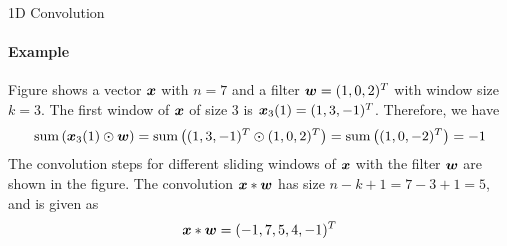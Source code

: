 %
\begin{frame}{1D Convolution}
\framesubtitle{Example}
Figure shows a vector ${\boldsymbol x}$ with $n=7$ and a
    filter ${\boldsymbol w} = (1,0,2)^T$ with window size $k=3$. The first window of
    ${\boldsymbol x}$ of size 3 is ${\boldsymbol x}_3(1) = (1, 3, -1)^T$. Therefore, %
we have
    \begin{align*}
        \operatorname*{sum}\left({\boldsymbol x}_3(1) \odot {\boldsymbol w}\right) = \operatorname*{sum}\left(
        (1,3,-1)^T \odot (1,0,2)^T \right) = 
        \operatorname*{sum}\left( (1,0,-2)^T\right)  = -1
    \end{align*}
    The convolution steps for different sliding windows of ${\boldsymbol x}$ with the
    filter ${\boldsymbol w}$ are shown in  the figure.
    The convolution ${\boldsymbol x} \ast {\boldsymbol w}$ has size $n-k+1 = 7-3+1 = 5$, and is
    given as 
    \[    {\boldsymbol x} \ast {\boldsymbol w} = (-1, 7, 5, 4 ,-1)^T \]
\end{frame}
%
%
